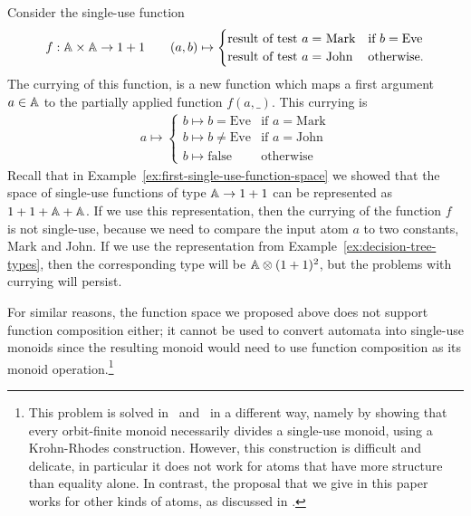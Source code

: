 \documentclass[a4paper,UKenglish,cleveref, autoref, numberwithinsect, thm-restate]{lipics-v2021}
\begin{document}
\begin{example}\label{ex:currying-not-single-use}
    Consider  the single-use function
    \begin{align*}
    f : \mathbb A \times \mathbb A \to 1 + 1 \qquad (a,b)  
    \mapsto \begin{cases}
        \text{result of test $a = $ Mark} & \text{if } b = \text{Eve} \\
        \text{result of test $a = $ John} & \text{otherwise}.
        \end{cases}
    \end{align*}
The currying of this function, is a new function which  maps a first argument $a \in \mathbb A$ to the partially applied function $f(a,\_)$. This currying is
\begin{align*}
    a \mapsto \begin{cases}
        b \mapsto b = \text{Eve} & \text{if } a = \text{Mark} \\
        b \mapsto b \neq \text{Eve} & \text{if } a = \text{John} \\
        b \mapsto \text{false} & \text{otherwise}
        \end{cases}
\end{align*}
Recall that in Example~\ref{ex:first-single-use-function-space} we showed that the space of single-use functions of type $\mathbb A \to 1 + 1$ can be represented as $1 + 1 + \mathbb A + \mathbb A$. If we use this representation,  then the currying of the function $f$  is not single-use, because we need to compare the input atom $a$ to two constants, Mark and John. If we use the representation from Example~\ref{ex:decision-tree-types}, then the corresponding type will be $\mathbb A \otimes (1 + 1)^2$, but the problems with currying will persist. \exampleend
\end{example}

For similar reasons, the function space we proposed above does not support function composition either; it cannot be used to convert automata into single-use monoids since the resulting monoid would need to use function composition as its monoid operation.\footnote{This problem is solved in~\cite{bojanczykstefanski2020} and~\cite{stefanski-phd} in a different way, namely by showing that every orbit-finite monoid necessarily divides a single-use monoid, using a  Krohn-Rhodes construction. However, this construction is difficult and delicate, in particular it does not work for atoms that have more structure than equality alone. In contrast, the proposal that we give in this paper works for other kinds of atoms, as discussed in . }
\end{document}
